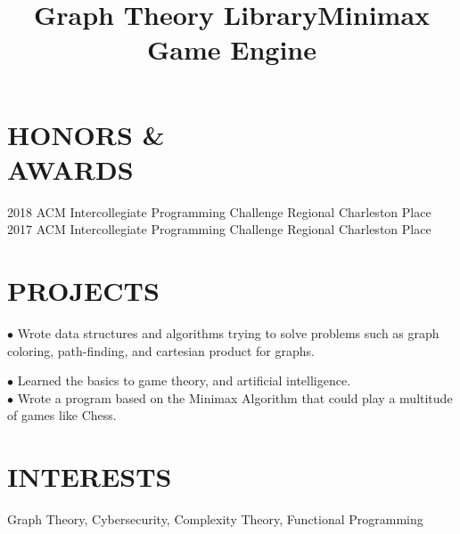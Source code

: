 \documentclass[margin]{res}
\begin{document}
\begin{resume}
\section{HONORS \&\\AWARDS}
2018 ACM Intercollegiate Programming Challenge Regional Charleston  Place\\
2017 ACM Intercollegiate Programming Challenge Regional Charleston  Place
\section{PROJECTS}
\location{}
\title{\textbf{Graph Theory Library}}
\begin{position}
$\bullet$ Wrote data structures and algorithms trying to solve problems such as graph coloring, path-finding, and cartesian product for graphs.
\end{position}

\title{\textbf{Minimax Game Engine}}
\begin{position}
$\bullet$ Learned the basics to game theory, and artificial intelligence.\\
$\bullet$ Wrote a program based on the Minimax Algorithm that could play a multitude of games like Chess.
\end{position}

\section{INTERESTS}
Graph Theory, Cybersecurity, Complexity Theory, Functional Programming
\end{resume}
\end{document}
